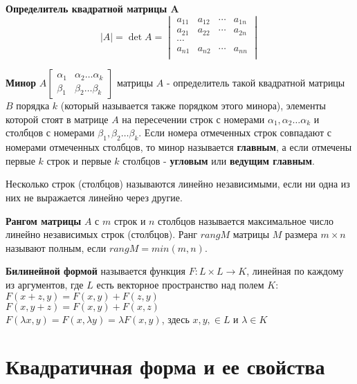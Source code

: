 \documentclass[bachelor, och, coursework, times]{SCWorks}
\newcommand\tab[1][1cm]{\hspace*{#1}}
\begin{document}
\textbf{Определитель квадратной матрицы A} $$|A|=\det A=\begin{vmatrix}
a_{11} & a_{12} & \cdots & a_{1n} \\ 
a_{21} & a_{22} & \cdots & a_{2n} \\ 
\cdots \\
a_{n1} & a_{n2} & \cdots & a_{nn} \\ 
\end{vmatrix}
$$

\textbf{Минор} $A \begin{bmatrix} \alpha_1 & \alpha_2 \dots \alpha_k \\ \beta_1 & \beta_2 \dots \beta_k \end{bmatrix}$ матрицы $A$ - определитель такой квадратной матрицы $B$ порядка $k$ (который называется также порядком этого минора), элементы которой стоят в матрице $A$ на пересечении строк с номерами $\alpha_1, \alpha_2 \dots \alpha_k$ и столбцов с номерами $\beta_1, \beta_2 \dots \beta_k$. Если номера отмеченных строк совпадают с номерами отмеченных столбцов, то минор называется \textbf{главным}, а если отмечены первые $k$ строк и первые $k$ столбцов - \textbf{угловым} или \textbf{ведущим главным}. \cite{3}

Несколько строк (столбцов) называются линейно независимыми, если ни одна из них не выражается линейно через другие. \cite{4}

\textbf{Рангом матрицы} $A$ с $m$ строк и $n$ столбцов называется максимальное число линейно независимых строк (столбцов). Ранг $rangM$ матрицы $M$ размера $m \times n$ называют полным, если $rangM = min(m,n)$. \cite{4}

\textbf{Билинейной формой} называется функция $F:L \times L \to K$, линейная по каждому из аргументов, где $L$ есть векторное пространство над полем $K$: \\
\tab $F(x+z,y)=F(x,y)+F(z,y)$ \\
\tab $F(x,y+z)=F(x,y)+F(x,z)$ \\
\tab $F(\lambda x,y)= F(x,\lambda y) = \lambda F(x,y)$, здесь $x,y,\in L$ и $\lambda \in K$ \cite{5}


\section{Квадратичная форма и ее свойства}
\end{document}
